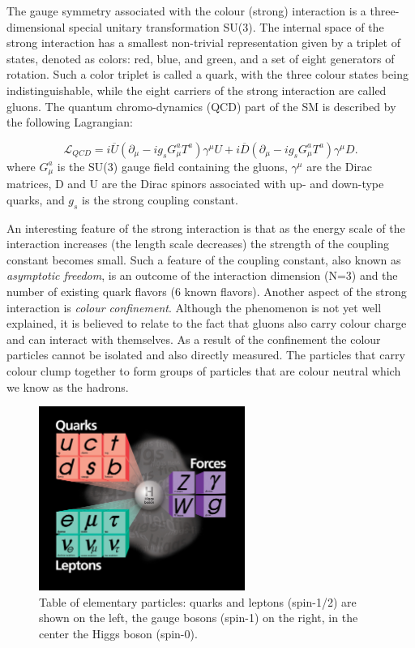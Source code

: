 The gauge symmetry associated with the colour (strong) interaction is a three-dimensional special
unitary transformation SU(3). The internal space of the strong interaction has a smallest
non-trivial representation given by a triplet of states, denoted as colors: red, blue, and green,
and a set of eight generators of rotation. Such a color triplet is called a quark, with the
three colour states being indistinguishable, while the
eight carriers of the strong interaction are called gluons. 
The quantum chromo-dynamics (QCD)
part of the SM is described by the following Lagrangian:

\begin{equation}
\mathcal{L}_{QCD} = i\overline U (\partial_\mu-ig_sG_\mu^a T^a)\gamma^\mu U + i\overline D (\partial_\mu-i g_s G_\mu^a T^a)\gamma^\mu D.
\label{eqn:LagrQCD}
\end{equation}
where $G_\mu^a$ is the SU(3) gauge field containing the gluons, $\gamma^\mu$ are the Dirac matrices,
 D and U are the Dirac spinors associated with up- and down-type quarks, and $g_s$ 
is the strong coupling constant.

An interesting feature of the strong interaction is that as the energy scale of the interaction 
increases (the length scale decreases) the strength of the coupling constant becomes small.
Such a feature of the coupling constant,
 also known as {\it asymptotic freedom},
 is an outcome of the interaction dimension (N=3) and the number of existing
quark flavors (6 known flavors).
 Another aspect of the strong interaction is {\it colour
confinement}. Although the phenomenon is not yet well explained, it is believed to
 relate to the fact that gluons also carry colour charge and can interact
with themselves. As a result of the confinement the colour particles 
cannot be isolated and also directly measured. The particles that carry colour
 clump together to form groups of particles that are colour neutral which we know as the hadrons.

\begin{figure}
\centering
\includegraphics[width=0.6\textwidth]{plots/intro/Higgs_SM.jpeg}
\caption{Table of elementary particles: quarks and leptons (spin-1/2) are shown on the left,
the gauge bosons (spin-1) on the right, in the center the Higgs boson (spin-0).
\label{fig:parttable}}

\end{figure}

